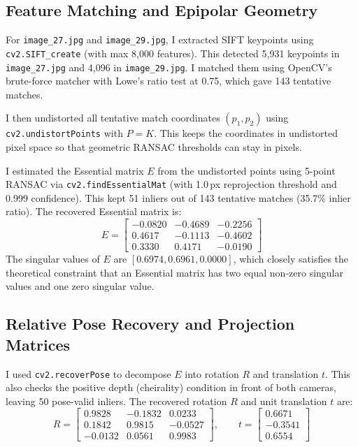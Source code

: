 \documentclass[12pt]{article}
\begin{document}
\subsection{Feature Matching and Epipolar Geometry}
For \texttt{image\_27.jpg} and \texttt{image\_29.jpg}, I extracted SIFT keypoints using \texttt{cv2.SIFT\_create} (with max 8,000 features). This detected 5,931 keypoints in \texttt{image\_27.jpg} and 4,096 in \texttt{image\_29.jpg}. I matched them using OpenCV's brute-force matcher with Lowe's ratio test at 0.75, which gave 143 tentative matches.

I then undistorted all tentative match coordinates $(p_1, p_2)$ using \texttt{cv2.undistortPoints} with $P = K$. This keeps the coordinates in undistorted pixel space so that geometric RANSAC thresholds can stay in pixels.

I estimated the Essential matrix $E$ from the undistorted points using 5-point RANSAC via \texttt{cv2.findEssentialMat} (with 1.0\,px reprojection threshold and 0.999 confidence). This kept 51 inliers out of 143 tentative matches (35.7\% inlier ratio). The recovered Essential matrix is:
\begin{equation}
E = \begin{bmatrix}
-0.0820 & -0.4689 & -0.2256 \\
 0.4617 & -0.1113 & -0.4602 \\
 0.3330 &  0.4171 & -0.0190
\end{bmatrix}
\label{eq:essential_matrix}
\end{equation}
The singular values of $E$ are $[0.6974, 0.6961, 0.0000]$, which closely satisfies the theoretical constraint that an Essential matrix has two equal non-zero singular values and one zero singular value.

\subsection{Relative Pose Recovery and Projection Matrices}
I used \texttt{cv2.recoverPose} to decompose $E$ into rotation $R$ and translation $t$. This also checks the positive depth (cheirality) condition in front of both cameras, leaving 50 pose-valid inliers. The recovered rotation $R$ and unit translation $t$ are:
\begin{equation}
R = \begin{bmatrix}
 0.9828 & -0.1832 &  0.0233 \\
 0.1842 &  0.9815 & -0.0527 \\
-0.0132 &  0.0561 &  0.9983
\end{bmatrix}, \qquad
t = \begin{bmatrix}
 0.6671 \\
-0.3541 \\
 0.6554
\end{bmatrix}
\label{eq:pose}
\end{equation}
\end{document}
